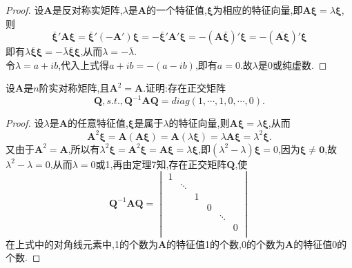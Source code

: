 \documentclass[lang=cn,11pt,normal]{elegantbook}
\begin{document}
	\begin{proof}
		设$\boldsymbol{A}$是反对称实矩阵,$\lambda$是$\boldsymbol{A}$的一个特征值,$\boldsymbol{\xi}$为相应的特征向量,即$\boldsymbol{A\xi}=\lambda\boldsymbol{\xi}$,则
		$$
		\bar{\boldsymbol{\xi}}'\boldsymbol{A\xi}=\bar{\boldsymbol{\xi}}'(-\boldsymbol{A}')\boldsymbol{\xi}=-\bar{\boldsymbol{\xi}}'\boldsymbol{A}'\boldsymbol{\xi}=-(\boldsymbol{A}\bar{\boldsymbol{\xi}})'\boldsymbol{\xi}=-(\overline{\boldsymbol{A\xi}})'\boldsymbol{\xi}
		$$
		即有$\lambda\bar{\boldsymbol{\xi}}\boldsymbol{\xi}=-\bar{\lambda}\bar{\boldsymbol{\xi}}\boldsymbol{\xi}$,从而$\lambda=-\bar{\lambda}$.\\
		令$\lambda=a+ib$,代入上式得$a+ib=-(a-ib)$,即有$a=0$.故$\lambda$是0或纯虚数.
	\end{proof}
	\begin{exercise}
		设$\boldsymbol{A}$是$n$阶实对称矩阵,且$\boldsymbol{A}^2=\boldsymbol{A}$.证明:存在正交矩阵
		$$
		\boldsymbol{Q},s.t.,\boldsymbol{Q}^{-1}\boldsymbol{AQ}=diag(1,\cdots,1,0,\cdots,0).
		$$
	\end{exercise}
	\begin{proof}
		设$\lambda$是$\boldsymbol{A}$的任意特征值,$\boldsymbol{\xi}$是属于$\lambda$的特征向量,则$\boldsymbol{A\xi}=\lambda\boldsymbol{\xi}$,从而
		$$
		\boldsymbol{A}^2\boldsymbol{\xi}=\boldsymbol{A}(\boldsymbol{A\xi})=\boldsymbol{A}(\lambda\boldsymbol{\xi})=\lambda\boldsymbol{A\xi}=\lambda^2\boldsymbol{\xi}.
		$$
		又由于$\boldsymbol{A}^2=\boldsymbol{A}$,所以有$\lambda^2\boldsymbol{\xi}=\boldsymbol{A}^2\boldsymbol{\xi}=\boldsymbol{A\xi}=\lambda\boldsymbol{\xi}$,即$(\lambda^2-\lambda)\boldsymbol{\xi}=0$,因为$\boldsymbol{\xi}\ne\boldsymbol{0}$,故$\lambda^2-\lambda=0$,从而$\lambda=0$或1,再由定理7知,存在正交矩阵$\boldsymbol{Q}$,使
		$$
		\boldsymbol{Q}^{-1}\boldsymbol{AQ}=
		\begin{vmatrix}
		1& & & & & \\
		&\ddots& & & & \\
		& &1& & & \\
		& & &0& & \\
		& & & &\ddots& \\
		& & & & &0\\
		\end{vmatrix}
		$$
		在上式中的对角线元素中,1的个数为$\boldsymbol{A}$的特征值1的个数,0的个数为$\boldsymbol{A}$的特征值0的个数.
	\end{proof}
\end{document}
